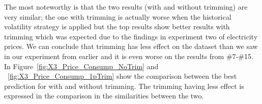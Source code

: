 \begin{table}[H]
\centering  %
\caption{Calculated inputs on Price \& demand with 1\% trim.} %
\label{table:price_consumption_x3_1pTrim} %
\end{table}

The most noteworthy is that the two results (with and without trimming) are very similar; the one with trimming is actually worse when the historical volatility strategy is applied but the top results show better results with trimming which was expected due to the findings in experiment two of electricity prices. We can conclude that trimming has less effect on the dataset than we saw in our experiment from earlier and it is even worse on the results from \#7-\#15. In Figure~\ref{fig:X3_Price_Consump_NoTrim} and ~\ref{fig:X3_Price_Consump_1pTrim} show the comparison between the best prediction for with and without trimming. The trimming having less effect is expressed in the comparison in the similarities between the two. 

